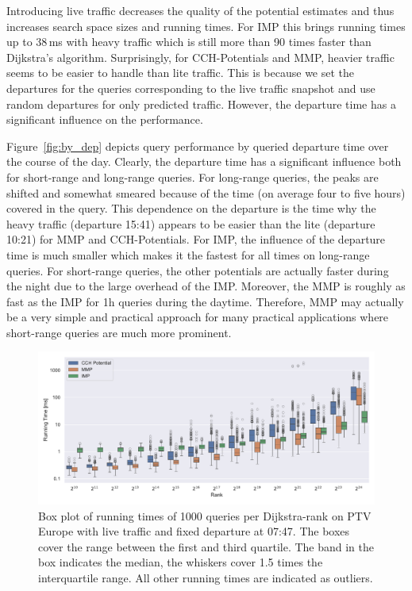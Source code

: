 \documentclass[a4paper,UKenglish,cleveref, autoref, thm-restate,anonymous]{lipics-v2021}
\begin{document}
Introducing live traffic decreases the quality of the potential estimates and thus increases search space sizes and running times.
For IMP this brings running times up to 38\,ms with heavy traffic which is still more than 90 times faster than Dijkstra's algorithm.
Surprisingly, for CCH-Potentials and MMP, heavier traffic seems to be easier to handle than lite traffic.
This is because we set the departures for the queries corresponding to the live traffic snapshot and use random departures for only predicted traffic.
However, the departure time has a significant influence on the performance.

Figure~\ref{fig:by_dep} depicts query performance by queried departure time over the course of the day.
Clearly, the departure time has a significant influence both for short-range and long-range queries.
For long-range queries, the peaks are shifted and somewhat smeared because of the time (on average four to five hours) covered in the query.
This dependence on the departure is the time why the heavy traffic (departure 15:41) appears to be easier than the lite (departure 10:21) for MMP and CCH-Potentials.
For IMP, the influence of the departure time is much smaller which makes it the fastest for all times on long-range queries.
For short-range queries, the other potentials are actually faster during the night due to the large overhead of the IMP.
Moreover, the MMP is roughly as fast as the IMP for 1h queries during the daytime.
Therefore, MMP may actually be a very simple and practical approach for many practical applications where short-range queries are much more prominent.

\begin{figure}
\centering
\includegraphics[width=\linewidth]{fig/ranks.pdf}
\caption{
Box plot of running times of 1000 queries per Dijkstra-rank on PTV Europe with live traffic and fixed departure at 07:47.
The boxes cover the range between the first and third quartile.
The band in the box indicates the median, the whiskers cover 1.5 times the interquartile range.
All other running times are indicated as outliers.
}\label{fig:ranks}
\end{figure}
\end{document}
